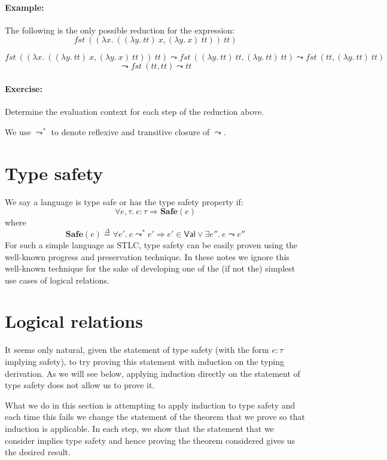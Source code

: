 \documentclass{article}
\newcommand{\fst}{\mathit{fst}}
\newcommand{\TT}{\mathit{tt}}
\newcommand{\VAL}{\mathsf{Val}}
\newcommand{\defeq}{\overset{\Delta}{=}}
\begin{document}
\paragraph{Example:} The following is the only possible reduction
for the expression:
\[
\fst~((\lambda x.~((\lambda y.~ \TT)~x, (\lambda y.~ x)~\TT))~\TT)
\]

\[
\fst~((\lambda x.~((\lambda y.~ \TT)~x, (\lambda y.~ x)~\TT))~\TT) \leadsto
\fst~((\lambda y.~ \TT)~\TT, (\lambda y.~ \TT)~\TT) \leadsto
\fst~(\TT, (\lambda y.~ \TT)~\TT)
\]
\[
\leadsto \fst~(\TT, \TT) \leadsto \TT
\]

\paragraph{Exercise:} Determine the evaluation context for each step of the reduction above.

We use $\leadsto^*$ to denote reflexive and transitive closure of $\leadsto$.

\section{Type safety}
We say a language is type safe or has the type safety property if:
\[
\forall e, \tau.~e : \tau \Rightarrow \mathbf{Safe}(e)
\]
where
\[
\mathbf{Safe}(e) \defeq \forall e'.~ e \leadsto^* e'
\Rightarrow e' \in \VAL \lor \exists e''.~e\leadsto e''
\]
For such a simple language as STLC, type safety can be easily proven using the well-known progress and preservation technique. In these notes we ignore this well-known technique for the sake of developing one of the (if not the) simplest use cases of logical relations.

\section{Logical relations}
It seems only natural, given the statement of type safety (with the form $e : \tau$ implying safety), to try proving this statement with induction on the typing derivation.
As we will see below, applying induction directly on the statement of type safety does not allow us to prove it.

What we do in this section is attempting to apply induction to type safety and each time this fails we change the statement of the theorem that we prove so that induction is applicable. In each step, we show that the statement that we consider implies type safety and hence proving the theorem considered gives us the desired result.
\end{document}
